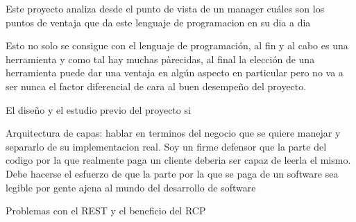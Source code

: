 Este proyecto analiza desde el punto de vista de un manager cuáles son los puntos de ventaja que da este lenguaje de programacion en su dia a dia

Esto no solo se consigue con el lenguaje de programación, al fin y al cabo es una herramienta y como tal hay muchas pàrecidas, al final la elección de una herramienta puede dar una ventaja en algún aspecto en particular pero no va a ser nunca el factor diferencial de cara al buen desempeño del proyecto.

El diseño y el estudio previo del proyecto si

Arquitectura de capas: hablar en terminos del negocio que se quiere manejar y separarlo de su implementacion real. Soy un firme defensor que la parte del codigo por la que realmente paga un cliente deberia ser capaz de leerla el mismo. Debe hacerse el esfuerzo de que la parte por la que se paga de un software sea legible por gente ajena al mundo del desarrollo de software

Problemas con el REST y el beneficio del RCP
